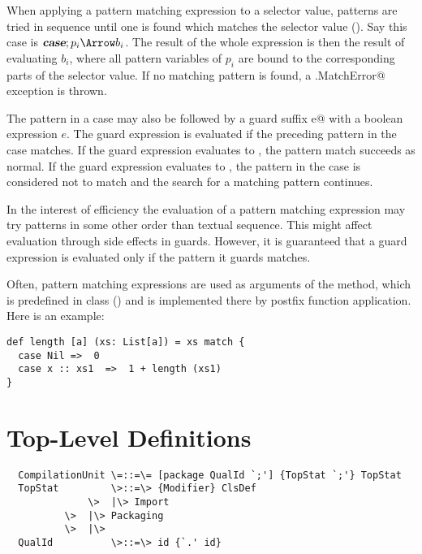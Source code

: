\documentclass[11pt]{report}
\begin{document}
When applying a pattern matching expression to a selector value,
patterns are tried in sequence until one is found which matches the
selector value (). Say this case is $\CASE;p_i
\Arrow b_i$.  The result of the whole expression is then the result of
evaluating $b_i$, where all pattern variables of $p_i$ are bound to
the corresponding parts of the selector value.  If no matching pattern
is found, a \verb@scala.MatchError@ exception is thrown.

The pattern in a case may also be followed by a guard suffix \verb@if e@
with a boolean expression $e$.  The guard expression is evaluated if
the preceding pattern in the case matches. If the guard expression
evaluates to \verb@true@, the pattern match succeeds as normal. If the
guard expression evaluates to \verb@false@, the pattern in the case
is considered not to match and the search for a matching pattern
continues.


In the interest of efficiency the evaluation of a pattern matching
expression may try patterns in some other order than textual
sequence. This might affect evaluation through
side effects in guards. However, it is guaranteed that a guard
expression is evaluated only if the pattern it guards matches.

\example
Often, pattern matching expressions are used as arguments
of the \verb@match@ method, which is predefined in class \verb@Any@
() and is implemented there by postfix function
application. Here is an example:
\begin{verbatim}
def length [a] (xs: List[a]) = xs match {
  case Nil =>  0
  case x :: xs1  =>  1 + length (xs1)
}
\end{verbatim}

\chapter{Top-Level Definitions}
\label{sec:topdefs}

\syntax\begin{verbatim}
  CompilationUnit \=::=\= [package QualId `;'] {TopStat `;'} TopStat
  TopStat         \>::=\> {Modifier} ClsDef
	          \>  |\> Import
		  \>  |\> Packaging
		  \>  |\>
  QualId          \>::=\> id {`.' id}
\end{verbatim}
\end{document}
